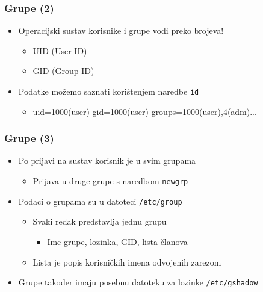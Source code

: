 \documentclass[table,usenames,dvipsnames] {beamer}
\newcommand{\shell}[1]{\texttt{#1}}
\begin{document}
\begin{frame}[t]
\frametitle{Grupe (2)}
\begin{itemize}
  \item Operacijski sustav korisnike i grupe vodi preko brojeva!
  \begin{itemize}
    \item UID (User ID)
    \item GID (Group ID)
  \end{itemize}
  \item Podatke možemo saznati korištenjem naredbe \shell{id}
  \begin{itemize}
	\item uid=1000(user) gid=1000(user) groups=1000(user),4(adm)...
  \end{itemize}
\end{itemize}
\end{frame}

\begin{frame}[t]
\frametitle{Grupe (3)}
\begin{itemize}
  \item Po prijavi na sustav korisnik je u svim grupama
  \begin{itemize}
    \item Prijava u druge grupe s naredbom \shell{newgrp}
  \end{itemize}
  \item Podaci o grupama su u datoteci \shell{/etc/group}
  \begin{itemize}
    \item Svaki redak predstavlja jednu grupu
    \begin{itemize}
      \item Ime grupe, lozinka, GID, lista članova
    \end{itemize}
    \item Lista je popis korisničkih imena odvojenih zarezom
  \end{itemize}
  \item Grupe također imaju posebnu datoteku za lozinke 
        \shell{/etc/gshadow}
\end{itemize}
\end{frame}
\end{document}
